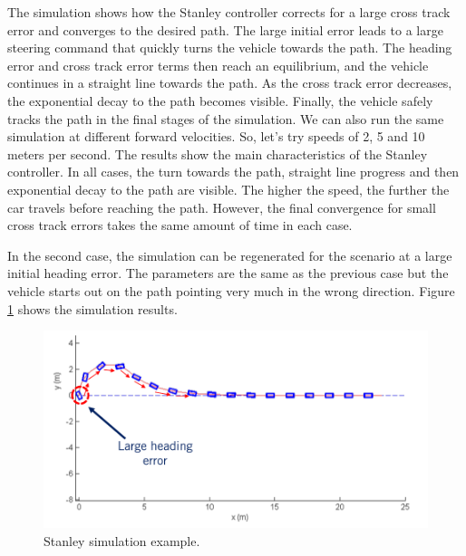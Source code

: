 The simulation shows how the Stanley controller corrects for a large cross track error and converges to the desired path. 
The large initial error leads to a large steering command that quickly turns the vehicle towards the path. 
The heading error and cross track error terms then reach an equilibrium, and the vehicle continues in a straight line towards the path. 
As the cross track error decreases, the exponential decay to the path becomes visible. Finally, the vehicle safely tracks the path in the final stages of the simulation. 
We can also run the same simulation at different forward velocities. So, let's try speeds of 2, 5 and 10 meters per second. The results show the main characteristics of the Stanley controller. In all cases, the turn towards the path, straight line progress and then exponential decay to the path are visible. 
The higher the speed, the further the car travels before reaching the path. 
However, the final convergence for small cross track errors takes the same amount of time in each case. 

In the second case, the simulation can be regenerated for the scenario at a large initial heading error. The parameters are the same as the previous case but the vehicle starts out on the path pointing very much in the wrong direction. Figure \ref{stanley_control_6} shows the simulation results. 

\begin{figure}[!htb]
\begin{center}
\includegraphics[scale=0.280]{img/lateral_control/stanley_control_6.jpeg}
\end{center}
\caption{Stanley simulation example.}
\label{stanley_control_6}
\end{figure}

